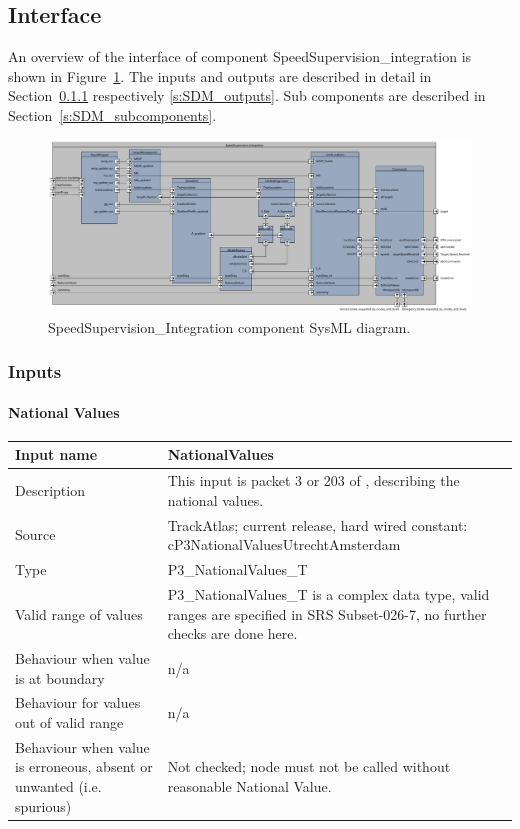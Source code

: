 \subsection{Interface}

An overview of the interface of component SpeedSupervision\_integration is shown in Figure~\ref{f:ssv}. The inputs and outputs are described in detail in Section~\ref{s:SDM_inputs} respectively \ref{s:SDM_outputs}. Sub components are described in Section~\ref{s:SDM_subcomponents}.

\begin{figure}
\centering
\includegraphics[width=0.95\textheight, angle=90]{../images/F2_7_SpeedSupervision_Integration.pdf}
\caption{SpeedSupervision\_Integration component SysML diagram.}\label{f:ssv}
\end{figure}



\subsubsection{Inputs}\label{s:SDM_inputs}

\paragraph{National Values}

\begin{longtable}{p{}p{}}
\toprule
Input name				& NationalValues \\
\midrule
Description				& This input is packet 3 or 203 of \cite[Chapt.~8]{subset-026}, describing the national values.  \\
\midrule
Source					& TrackAtlas; current release, hard wired constant: cP3NationalValuesUtrechtAmsterdam \\
\midrule
Type					& P3\_NationalValues\_T \\
\midrule
Valid range of values	& P3\_NationalValues\_T is a complex data type, valid ranges are specified in SRS Subset-026-7, no further checks are done here. \\
\midrule
Behaviour when value is at boundary	& n/a \\
\midrule
Behaviour for values out of valid range	& n/a \\
\midrule
Behaviour when value is erroneous, absent or unwanted (i.e. spurious) & Not checked; node must not be called without reasonable National Value. \\
\bottomrule
\end{longtable}


